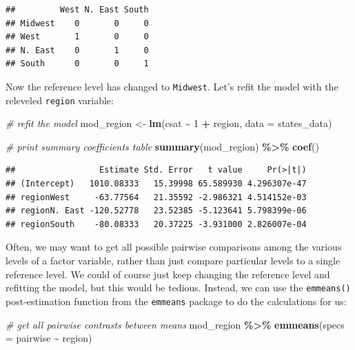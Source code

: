 \documentclass[
]{book}
\newenvironment{Shaded}{\begin{snugshade}}{\end{snugshade}}
\newcommand{\CommentTok}[1]{\textcolor[rgb]{0.56,0.35,0.01}{\textit{#1}}}
\newcommand{\DataTypeTok}[1]{\textcolor[rgb]{0.13,0.29,0.53}{#1}}
\newcommand{\DecValTok}[1]{\textcolor[rgb]{0.00,0.00,0.81}{#1}}
\newcommand{\KeywordTok}[1]{\textcolor[rgb]{0.13,0.29,0.53}{\textbf{#1}}}
\newcommand{\NormalTok}[1]{#1}
\newcommand{\OperatorTok}[1]{\textcolor[rgb]{0.81,0.36,0.00}{\textbf{#1}}}
\newcommand{\StringTok}[1]{\textcolor[rgb]{0.31,0.60,0.02}{#1}}
\begin{document}
\begin{verbatim}
##         West N. East South
## Midwest    0       0     0
## West       1       0     0
## N. East    0       1     0
## South      0       0     1
\end{verbatim}

Now the reference level has changed to \texttt{Midwest}. Let's refit the model with the releveled \texttt{region} variable:

\begin{Shaded}
\begin{Highlighting}[]
  \CommentTok{\# refit the model}
\NormalTok{  mod\_region \textless{}{-}}\StringTok{ }\KeywordTok{lm}\NormalTok{(csat }\OperatorTok{\textasciitilde{}}\StringTok{ }\DecValTok{1} \OperatorTok{+}\StringTok{ }\NormalTok{region, }\DataTypeTok{data =}\NormalTok{ states\_data)}

  \CommentTok{\# print summary coefficients table}
  \KeywordTok{summary}\NormalTok{(mod\_region) }\OperatorTok{\%\textgreater{}\%}\StringTok{ }\KeywordTok{coef}\NormalTok{()}
\end{Highlighting}
\end{Shaded}

\begin{verbatim}
##                 Estimate Std. Error   t value     Pr(>|t|)
## (Intercept)   1010.08333   15.39998 65.589930 4.296307e-47
## regionWest     -63.77564   21.35592 -2.986321 4.514152e-03
## regionN. East -120.52778   23.52385 -5.123641 5.798399e-06
## regionSouth    -80.08333   20.37225 -3.931000 2.826007e-04
\end{verbatim}

Often, we may want to get all possible pairwise comparisons among the various levels of a factor variable, rather than just compare particular levels to a single reference level. We could of course just keep changing the reference level and refitting the model, but this would be tedious. Instead, we can use the \texttt{emmeans()} post-estimation function from the \texttt{emmeans} package to do the calculations for us:

\begin{Shaded}
\begin{Highlighting}[]
  \CommentTok{\# get all pairwise contrasts between means}
\NormalTok{  mod\_region }\OperatorTok{\%\textgreater{}\%}
\StringTok{      }\KeywordTok{emmeans}\NormalTok{(}\DataTypeTok{specs =}\NormalTok{ pairwise }\OperatorTok{\textasciitilde{}}\StringTok{ }\NormalTok{region)}
\end{Highlighting}
\end{Shaded}
\end{document}
